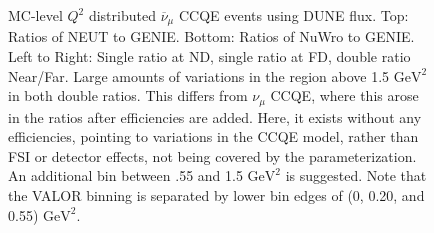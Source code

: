\documentclass[12pt]{article}
\begin{document}
\begin{figure}[h]
\endminipage
\caption{MC-level $Q^2$ distributed $\overline{\nu}_{\mu}$ CCQE events using DUNE flux. Top: Ratios of NEUT to GENIE. Bottom: Ratios of NuWro to GENIE. Left to Right: Single ratio at ND, single ratio at FD, double ratio Near/Far. Large amounts of variations in the region above 1.5 $\textrm{GeV}^2$ in both double ratios. This differs from $\nu_{\mu}$ CCQE, where this arose in the ratios after efficiencies are added. Here, it exists without any efficiencies, pointing to variations in the CCQE model, rather than FSI or detector effects, not being covered by the parameterization. An additional bin between .55 and 1.5 $\textrm{GeV}^2$ is suggested. Note that the VALOR binning is separated by lower bin edges of (0, 0.20, and 0.55) $\textrm{GeV}^2$.}
\label{fig:Q2_ccqe_bar}
\end{figure}
\FloatBarrier
\end{document}
